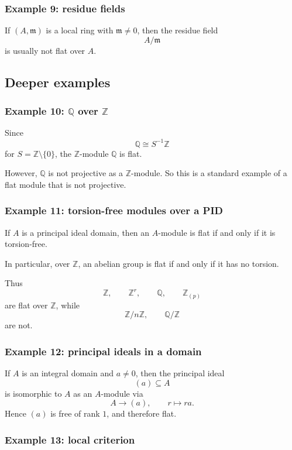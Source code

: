 \documentclass[12pt,a4paper]{article}
\theoremstyle{notespace}
\begin{document}
\subsubsection*{Example 9: residue fields}

If \((A,\mathfrak m)\) is a local ring with \(\mathfrak m\neq 0\), then the residue field
\[
A/\mathfrak m
\]
is usually not flat over \(A\).

\subsection{Deeper examples}

\subsubsection*{Example 10: \(\mathbb Q\) over \(\mathbb Z\)}

Since
\[
\mathbb Q \cong S^{-1}\mathbb Z
\]
for \(S=\mathbb Z\setminus\{0\}\), the \(\mathbb Z\)-module \(\mathbb Q\) is flat.

However, \(\mathbb Q\) is not projective as a \(\mathbb Z\)-module. So this is a standard example of a flat module that is not projective.

\subsubsection*{Example 11: torsion-free modules over a PID}

If \(A\) is a principal ideal domain, then an \(A\)-module is flat if and only if it is torsion-free.

In particular, over \(\mathbb Z\), an abelian group is flat if and only if it has no torsion.

Thus
\[
\mathbb Z,\qquad \mathbb Z^r,\qquad \mathbb Q,\qquad \mathbb Z_{(p)}
\]
are flat over \(\mathbb Z\), while
\[
\mathbb Z/n\mathbb Z,\qquad \mathbb Q/\mathbb Z
\]
are not.

\subsubsection*{Example 12: principal ideals in a domain}

If \(A\) is an integral domain and \(a\neq 0\), then the principal ideal
\[
(a)\subseteq A
\]
is isomorphic to \(A\) as an \(A\)-module via
\[
A\to (a),\qquad r\mapsto ra.
\]
Hence \((a)\) is free of rank \(1\), and therefore flat.

\subsubsection*{Example 13: local criterion}
\end{document}
